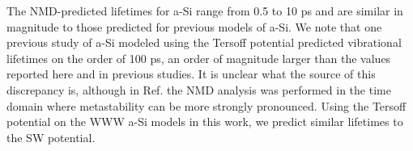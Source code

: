 \documentclass[aps,prb,twocolumn,superscriptaddress,footinbib,amsmath,amssymb,floatfix]{revtex4}
\begin{document}
The NMD-predicted lifetimes for a-Si range from 0.5 to 10 ps 
and are similar in magnitude to 
those predicted for previous models of a-Si.
\cite{fabian_anharmonic_1996,bickham_calculation_1998,
bickham_numerical_1999,fabian_numerical_2003}  
We note that one previous study of a-Si modeled using the 
Tersoff potential predicted vibrational lifetimes on 
the order of 100 ps, an order of magnitude larger than the values 
reported here and in previous studies.
\cite{fabian_anharmonic_1996,bickham_calculation_1998,
bickham_numerical_1999,fabian_numerical_2003} 
It is unclear what the source of this 
discrepancy is, although in Ref.  
the NMD analysis was performed in the time domain where metastability 
can be more strongly pronounced. Using the Tersoff potential on the 
WWW a-Si models in this work, we predict similar lifetimes to the 
SW potential. 

\clearpage
\end{document}
